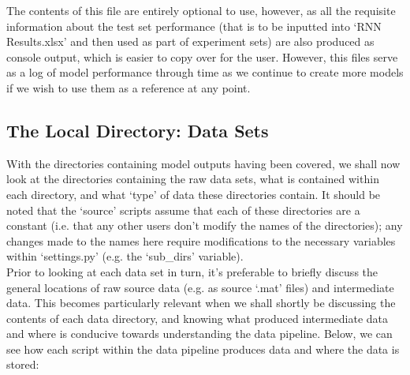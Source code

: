 \documentclass[12pt,twoside]{report}
\begin{document}
\quad The contents of this file are entirely optional to use, however, as all the requisite information about the test set performance (that is to be inputted into ‘RNN Results.xlsx’ and then used as part of experiment sets) are also produced as console output, which is easier to copy over for the user. However, this files serve as a log of model performance through time as we continue to create more models if we wish to use them as a reference at any point.



\subsection{The Local Directory: Data Sets}

\quad With the directories containing model outputs having been covered, we shall now look at the directories containing the raw data sets, what is contained within each directory, and what ‘type’ of data these directories contain. It should be noted that the ‘source’ scripts assume that each of these directories are a constant (i.e. that any other users don’t modify the names of the directories); any changes made to the names here require modifications to the necessary variables within ‘settings.py’ (e.g. the ‘sub\_dirs’ variable).\\

\quad Prior to looking at each data set in turn, it’s preferable to briefly discuss the general locations of raw source data (e.g. as source ‘.mat’ files) and intermediate data. This becomes particularly relevant when we shall shortly be discussing the contents of each data directory, and knowing what produced intermediate data and where is conducive towards understanding the data pipeline. Below, we can see how each script within the data pipeline produces data and where the data is stored:
\end{document}
